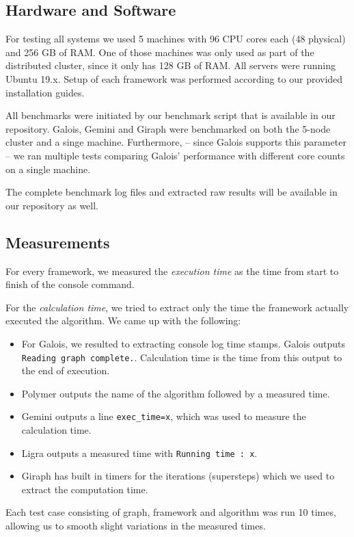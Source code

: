 
\subsection{Hardware and Software}
For testing all systems we used 5 machines with 96 CPU cores each (48 physical) and 256 GB of RAM. One of those machines was only used as part of the distributed cluster, since it only has 128 GB of RAM.
All servers were running Ubuntu 19.x.
Setup of each framework was performed according to our provided installation guides.

All benchmarks were initiated by our benchmark script that is available in our repository. Galois, Gemini and Giraph were benchmarked on both the 5-node cluster and a singe machine.
Furthermore, -- since Galois supports this parameter -- we ran multiple tests comparing Galois' performance with different core counts on a single machine.

The complete benchmark log files and extracted raw results will be available in our repository as well.

\subsection{Measurements}
For every framework, we measured the \emph{execution time} as the time from start to finish of the console command.

For the \emph{calculation time}, we tried to extract only the time the framework actually executed the algorithm. We came up with the following:
\begin{itemize}
	\item For Galois, we resulted to extracting console log time stamps. Galois outputs \texttt{Reading graph complete.}. Calculation time is the time from this output to the end of execution.
	\item Polymer outputs the name of the algorithm followed by a measured time.
	\item Gemini outputs a line \texttt{exec\_time=x}, which was used to measure the calculation time. 
	\item Ligra outputs a measured time with \texttt{Running time : x}.
	\item Giraph has built in timers for the iterations (supersteps) which we used to extract the computation time.
\end{itemize}
Each test case consisting of graph, framework and algorithm was run 10 times, allowing us to smooth slight variations in the measured times.

